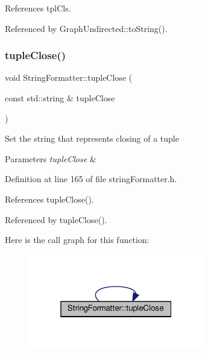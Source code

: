 References tpl\+Cls.



Referenced by Graph\+Undirected\+::to\+String().

\mbox{\label{classStringFormatter_adf784178e63ed4533c487e538c1a4390}} 
\subsubsection{\texorpdfstring{tuple\+Close()}{tupleClose()}\hspace{0.1cm}{\footnotesize\ttfamily [2/2]}}
{\footnotesize\ttfamily void String\+Formatter\+::tuple\+Close (\begin{DoxyParamCaption}\item[{const std\+::string \&}]{tuple\+Close }\end{DoxyParamCaption})\hspace{0.3cm}{\ttfamily [inline]}}

Set the string that represents closing of a tuple 
\begin{DoxyParams}{Parameters}
{\em tuple\+Close} & \\
\hline
\end{DoxyParams}


Definition at line 165 of file string\+Formatter.\+h.



References tuple\+Close().



Referenced by tuple\+Close().

Here is the call graph for this function\+:
\nopagebreak
\begin{figure}[H]
\begin{center}
\leavevmode
\includegraphics[width=217pt]{classStringFormatter_adf784178e63ed4533c487e538c1a4390_cgraph}
\end{center}
\end{figure}
\mbox{\label{classStringFormatter_a3644daa278010496dd9b9066c2e6718c}} 
